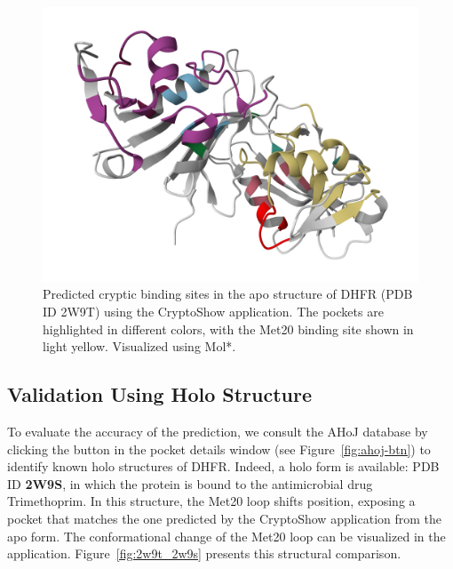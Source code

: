 \begin{figure}[htbp]
    \centering
    \includegraphics[width=\textwidth]{img/2w9t_prediction.png}
    \caption{Predicted cryptic binding sites in the apo structure of DHFR (PDB ID 2W9T) using the CryptoShow application. The pockets are highlighted in different colors, with the Met20 binding site shown in light yellow. Visualized using Mol*.}
    \label{fig:ui-cryptic-pocket}
\end{figure}

\subsection{Validation Using Holo Structure}
\label{subsec:holo-validation}

To evaluate the accuracy of the prediction, we consult the AHoJ database by clicking the button in the pocket details window (see Figure~\ref{fig:ahoj-btn}) to identify known holo structures of DHFR. Indeed, a holo form is available: PDB ID \textbf{2W9S}, in which the protein is bound to the antimicrobial drug Trimethoprim. In this structure, the Met20 loop shifts position, exposing a pocket that matches the one predicted by the CryptoShow application from the apo form. The conformational change of the Met20 loop can be visualized in the application. Figure~\ref{fig:2w9t_2w9s} presents this structural comparison.


